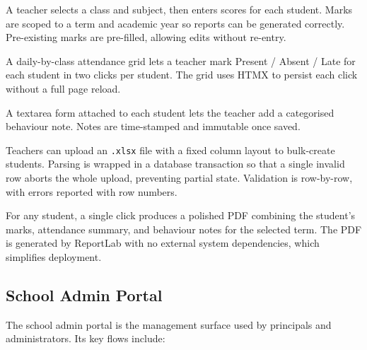 \documentclass[11pt,a4paper]{article}
\begin{document}
\begin{description}[leftmargin=2em,style=nextline]
    \item[Mark entry.] A teacher selects a class and subject, then enters
    scores for each student. Marks are scoped to a term and academic year
    so reports can be generated correctly. Pre-existing marks are
    pre-filled, allowing edits without re-entry.

    \item[Attendance.] A daily-by-class attendance grid lets a teacher mark
    Present / Absent / Late for each student in two clicks per student. The
    grid uses HTMX to persist each click without a full page reload.

    \item[Behavior notes.] A textarea form attached to each student lets
    the teacher add a categorised behaviour note. Notes are time-stamped
    and immutable once saved.

    \item[Bulk Excel upload.] Teachers can upload an \texttt{.xlsx} file
    with a fixed column layout to bulk-create students. Parsing is wrapped
    in a database transaction so that a single invalid row aborts the
    whole upload, preventing partial state. Validation is row-by-row, with
    errors reported with row numbers.

    \item[Term report PDF.] For any student, a single click produces a
    polished PDF combining the student's marks, attendance summary, and
    behaviour notes for the selected term. The PDF is generated by
    ReportLab with no external system dependencies, which simplifies
    deployment.
\end{description}

\subsection{School Admin Portal}

The school admin portal is the management surface used by principals and
administrators. Its key flows include:
\end{document}
